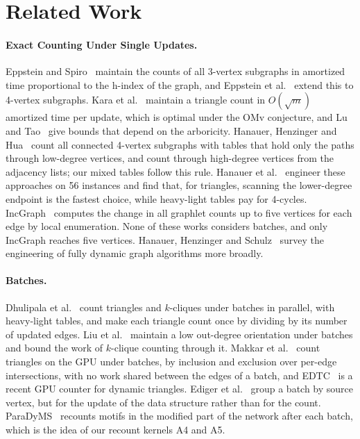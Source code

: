 \section{Related Work}
\label{sec:related}

\paragraph{Exact Counting Under Single Updates.}
Eppstein and Spiro~\cite{eppstein-spiro} maintain the counts of all 3-vertex subgraphs in amortized time proportional to the h-index of the graph, and Eppstein et al.~\cite{eppstein-extended} extend this to 4-vertex subgraphs.
Kara et al.~\cite{kara-tods} maintain a triangle count in $O(\sqrt{m})$ amortized time per update, which is optimal under the OMv conjecture, and Lu and Tao~\cite{lu-tao} give bounds that depend on the arboricity.
Hanauer, Henzinger and Hua~\cite{hhh} count all connected 4-vertex subgraphs with tables that hold only the paths through low-degree vertices, and count through high-degree vertices from the adjacency lists; our mixed tables follow this rule.
Hanauer et al.~\cite{hanauer-dyncount} engineer these approaches on 56 instances and find that, for triangles, scanning the lower-degree endpoint is the fastest choice, while heavy-light tables pay for 4-cycles.
IncGraph~\cite{incgraph} computes the change in all graphlet counts up to five vertices for each edge by local enumeration.
None of these works considers batches, and only IncGraph reaches five vertices.
Hanauer, Henzinger and Schulz~\cite{hanauer-survey} survey the engineering of fully dynamic graph algorithms more broadly.

\paragraph{Batches.}
Dhulipala et al.~\cite{dhulipala-batch-kclique} count triangles and $k$-cliques under batches in parallel, with heavy-light tables, and make each triangle count once by dividing by its number of updated edges.
Liu et al.~\cite{liu-batch-kcore} maintain a low out-degree orientation under batches and bound the work of $k$-clique counting through it.
Makkar et al.~\cite{makkar-dynamic-tc} count triangles on the GPU under batches, by inclusion and exclusion over per-edge intersections, with no work shared between the edges of a batch, and EDTC~\cite{edtc} is a recent GPU counter for dynamic triangles.
Ediger et al.~\cite{ediger-streaming} group a batch by source vertex, but for the update of the data structure rather than for the count.
ParaDyMS~\cite{paradyms} recounts motifs in the modified part of the network after each batch, which is the idea of our recount kernels A4 and A5.

